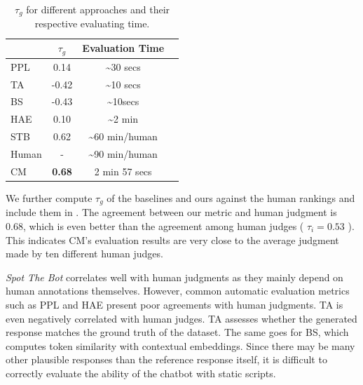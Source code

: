 \begin{table}[th]
\centering
\scriptsize
\begin{tabular}{lccc}
\toprule
 & $\tau_{g}$ & Evaluation Time \\ \midrule
PPL  &0.14 & \textasciitilde 30 secs \\
TA&-0.42 & \textasciitilde 10 secs \\
BS& -0.43 & \textasciitilde 10secs\\
HAE&0.10 &\textasciitilde 2 min\\
STB &0.62 & \textasciitilde 60 min/human\\
Human & -  & \textasciitilde 90 min/human \\
CM&\textbf{ 0.68} & 2 min 57 secs\\
 \bottomrule
\end{tabular}
\caption{$\tau_g$ for different approaches
 and their respective evaluating time.}
\label{tab:main}
\end{table}

We further compute $\tau_g$ of the baselines and 
ours against the human rankings and include them in . 
The agreement between our metric and human judgment is 0.68,
 which is even better than the agreement among human judges ( $\tau_i = 0.53$ ). 
This indicates CM's evaluation results are very close to the average 
judgment made by ten different human judges. 

\textit{Spot The Bot} correlates well with human judgments as they
mainly depend on human annotations themselves. 
However, common automatic evaluation metrics such as PPL and HAE 
present poor agreements with human judgments. 
TA is even negatively correlated with human judges. 
TA assesses whether the generated response matches the ground truth 
of the dataset. The same goes for BS, 
which computes token similarity with contextual embeddings.
Since there may be many other plausible responses than
the reference response itself, it is difficult to correctly evaluate 
the ability of the chatbot with static scripts.

